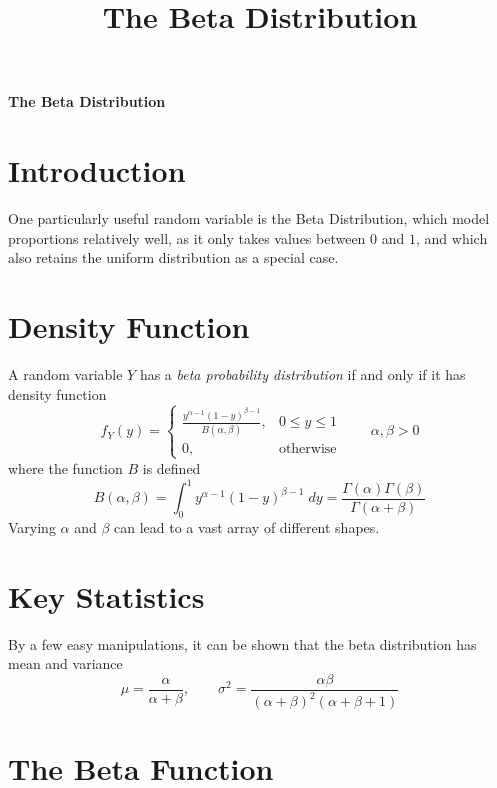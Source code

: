 \documentclass[a4paper,12pt]{scrartcl}
\author{}
\title{The Beta Distribution}
\date{}
\begin{document}
\begin{center} \bf \LARGE
   The Beta Distribution
\end{center}

\section{Introduction}
One particularly useful random variable is the Beta Distribution, which
model proportions relatively well, as it only takes values between
$0$ and $1$, and which also retains the uniform distribution as a special
case.

\section{Density Function}

A random variable $Y$ has a \emph{beta probability distribution} if 
and only if it has density function
\begin{equation}
   \label{pdf}
   f_Y(y) = \begin{cases} \frac{y^{\alpha -1} (1-y)^{\beta-1}}{B(\alpha,
      \beta)}, & 0\leq y \leq 1 \\
	 0, & \text{otherwise}
   \end{cases} \qquad \alpha, \beta > 0 
\end{equation}
where the function $B$ is defined
   \[ B(\alpha, \beta) = \int^1_0 y^{\alpha-1}(1-y)^{\beta-1} \; dy =
      \frac{\Gamma(\alpha)\Gamma(\beta)}{\Gamma(\alpha + \beta)} \]
Varying $\alpha$ and $\beta$ can lead to a vast array of different 
shapes.

\section{Key Statistics}

By a few easy manipulations, it can be shown that the beta distribution
has mean and variance
\begin{equation}
   \label{beta}
    \mu = \frac{\alpha}{\alpha+\beta}, \qquad \sigma^2 = 
      \frac{\alpha\beta}{(\alpha+\beta)^2 (\alpha+\beta+1)} 
\end{equation}

\section{The Beta Function}
\end{document}
